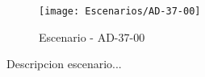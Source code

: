 \begin{figure}[H]
\centering
\texttt{[image: Escenarios/AD-37-00]}
\caption{Escenario - AD-37-00}
\label{fig:AD-37-00}
\end{figure}

Descripcion escenario...
\clearpage
